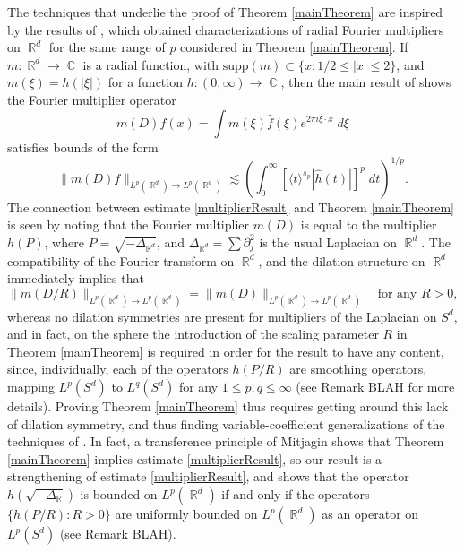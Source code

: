 \documentclass[dvipsnames,letterpaper,12pt]{article}
\DeclareMathOperator{\RR}{\mathbb{R}}
\DeclareMathOperator{\CC}{\mathbb{C}}
\begin{document}
The techniques that underlie the proof of Theorem \ref{mainTheorem} are inspired by the results of \cite{HeoandNazarovandSeeger}, which obtained characterizations of radial Fourier multipliers on $\RR^d$ for the same range of $p$ considered in Theorem \ref{mainTheorem}. If $m: \RR^d \to \CC$ is a radial function, with $\text{supp}(m) \subset \{ x : 1/2 \leq |x| \leq 2 \}$, and $m(\xi) = h(|\xi|)$ for a function $h: (0,\infty) \to \CC$, then the main result of \cite{HeoandNazarovandSeeger} shows the Fourier multiplier operator
%
\[ m(D) f (x) = \int m(\xi) \widehat{f}(\xi) e^{2 \pi i \xi \cdot x}\; d\xi \]
%
satisfies bounds of the form
%
\begin{equation} \label{multiplierResult}
    \| m(D) f \|_{L^p(\RR^d) \to L^p(\RR^d)} \lesssim \left( \int_0^\infty \left[ \langle t \rangle^{s_p} |\widehat{h}(t)| \right]^p\; dt \right)^{1/p}.
\end{equation}
%
The connection between estimate \eqref{multiplierResult} and Theorem \ref{mainTheorem} is seen by noting that the Fourier multiplier $m(D)$ is equal to the multiplier $h(P)$, where $P = \sqrt{-\Delta_{\RR^d}}$, and $\Delta_{\RR^d} = \sum \partial_j^2$ is the usual Laplacian on $\RR^d$. The compatibility of the Fourier transform on $\RR^d$, and the dilation structure on $\RR^d$ immediately implies that
%
\[ \| m(D/R) \|_{L^p(\RR^d) \to L^p(\RR^d)} = \| m(D) \|_{L^p(\RR^d) \to L^p(\RR^d)} \quad\text{for any $R > 0$}, \]
%
whereas no dilation symmetries are present for multipliers of the Laplacian on $S^d$, and in fact, on the sphere the introduction of the scaling parameter $R$ in Theorem \ref{mainTheorem} is required in order for the result to have any content, since, individually, each of the operators $h(P/R)$ are smoothing operators, mapping $L^p(S^d)$ to $L^q(S^d)$ for any $1 \leq p,q \leq \infty$ (see Remark BLAH for more details). Proving Theorem \ref{mainTheorem} thus requires getting around this lack of dilation symmetry, and thus finding variable-coefficient generalizations of the techniques of \cite{HeoandNazarovandSeeger}. In fact, a transference principle of Mitjagin shows that Theorem \ref{mainTheorem} implies estimate \eqref{multiplierResult}, so our result is a strengthening of estimate \ref{multiplierResult}, and shows that the operator $h(\sqrt{-\Delta_{\RR}})$ is bounded on $L^p(\RR^d)$ if and only if the operators $\{ h(P/R) : R > 0 \}$  are uniformly bounded on $L^p(\RR^d)$ as an operator on $L^p(S^d)$ (see Remark BLAH).
\end{document}
